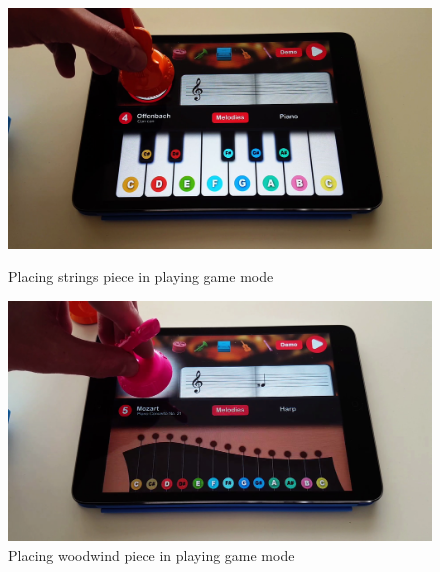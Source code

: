 \begin{figure}[ht!]
  \centering
  \includegraphics[width=350pt]{graphics/game-play/change_strings_playing.png}
  \vspace{0.05cm}
  \caption{Placing strings piece in playing game mode}
  \vspace{1cm}

  \includegraphics[width=350pt]{graphics/game-play/change_woodwind_playing.png}
  \vspace{0.05cm}
  \caption{Placing woodwind piece in playing game mode}
\end{figure}

